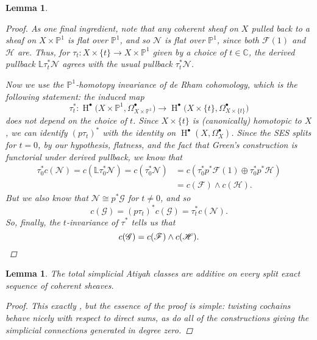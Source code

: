 \documentclass[11pt,fleqn]{article}
\theoremstyle{plain}
\newtheorem{lemma}[theorem]{Lemma}
\theoremstyle{definition}
\theoremstyle{remark}
\numberwithin{equation}{theorem}
\DeclareMathOperator{\HH}{H}
\begin{document}
\begin{lemma}
\begin{proof}
                As one final ingredient, note that any coherent sheaf on $X$ pulled back to a sheaf on $X\times\mathbb{P}^1$ is flat over $\mathbb{P}^1$, and so $\mathcal{N}$ is flat over $\mathbb{P}^1$, since both $\mathscr{F}(1)$ and $\mathscr{H}$ are.
                Thus, for $\tau_t\colon X\times\{t\}\to X\times\mathbb{P}^1$ given by a choice of $t\in\mathbb{C}$, the derived pullback $\mathbb{L}\tau_t^*\mathcal{N}$ agrees with the usual pullback $\tau_t^*\mathcal{N}$.

                Now we use the \emph{$\mathbb{P}^1$-homotopy invariance} of de Rham cohomology, which is the following statement: the induced map
                \begin{equation*}
                    \tau_t^*\colon\HH^\bullet\big(X\times\mathbb{P}^1,\Omega_{X\times\mathbb{P}^1}^\bullet\big) \to \HH^\bullet\big(X\times\{t\},\Omega_{X\times\{t\}}^\bullet\big)
                \end{equation*}
                does \emph{not} depend on the choice of $t$.
                Since $X\times\{t\}$ is (canonically) homotopic to $X$, we can identify $(p\tau_t)^*$ with the identity on $\HH^\bullet(X,\Omega_X^\bullet)$.
                Since the SES splits for $t=0$, by our hypothesis, flatness, and the fact that Green's construction is functorial under derived pullback, we know that
                \begin{align*}
                    \tau_0^*c(\mathcal{N}) = c(\mathbb{L}\tau_0^*\mathcal{N}) = c(\tau_0^*\mathcal{N}) &= c(\tau_0^*p^*\mathscr{F}(1)\oplus\tau_0^*p^*\mathscr{H})\\
                    &= c(\mathscr{F})\wedge c(\mathscr{H}).
                \end{align*}
                But we also know that $\mathcal{N}\cong p^*\mathscr{G}$ for $t\neq0$, and so
                \begin{equation*}
                    c(\mathscr{G}) = (p\tau_t)^*c(\mathscr{G}) = \tau_t^*c(\mathcal{N}).
                \end{equation*}
                So, finally, the $t$-invariance of $\tau^*$ tells us that
                \begin{equation*}
                    c(\mathscr{G}) = c(\mathscr{F})\wedge c(\mathscr{H}).\qedhere
                \end{equation*}
            \end{proof}
        \end{lemma}

        \begin{lemma}\label{lemma:additive-on-split}
            The total simplicial Atiyah classes are additive on every split exact sequence of coherent sheaves.
            \begin{proof}
                This exactly \cite[Lemma~2.6]{Green1980}, but the essence of the proof is simple: twisting cochains behave nicely with respect to direct sums, as do all of the constructions giving the simplicial connections generated in degree zero.
            \end{proof}
        \end{lemma}
\end{document}
